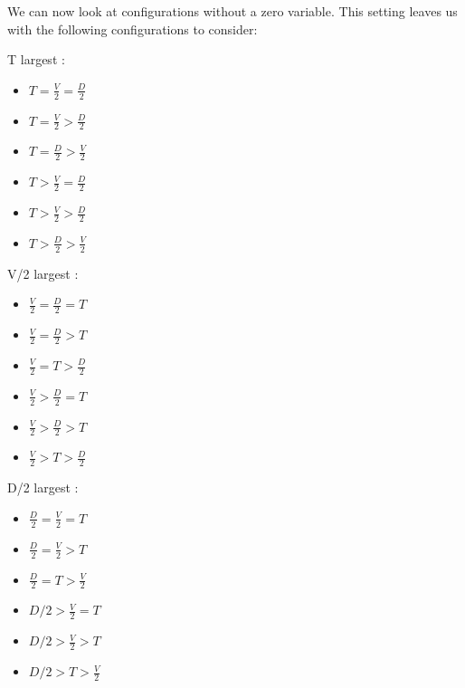 \documentclass[a4paper, 11pt]{article}
\begin{document}
We can now look at configurations without a zero variable. This setting leaves us with the following configurations to consider:

\begin{varwidth}[t]{.33\textwidth}
T largest :
\begin{itemize}
  \setlength\itemsep{0.5em}
  \item $T=\frac{V}{2}=\frac{D}{2}$
  \item $T=\frac{V}{2}>\frac{D}{2}$
  \item $T=\frac{D}{2}>\frac{V}{2}$
  \item $T>\frac{V}{2}=\frac{D}{2}$
  \item $T>\frac{V}{2}>\frac{D}{2}$
  \item $T>\frac{D}{2}>\frac{V}{2}$
\end{itemize}
\end{varwidth}%
\hspace{4em}%
\begin{varwidth}[t]{.33\textwidth}
V/2 largest :
\begin{itemize}
  \setlength\itemsep{0.5em}
  \item \textcolor{mygray}{$\frac{V}{2}=\frac{D}{2}=T$} %
  \item $\frac{V}{2}=\frac{D}{2}>T$
  \item \textcolor{mygray}{$\frac{V}{2}=T>\frac{D}{2}$} %
  \item $\frac{V}{2}>\frac{D}{2}=T$
  \item $\frac{V}{2}>\frac{D}{2}>T$
  \item $\frac{V}{2}>T>\frac{D}{2}$
\end{itemize}
\end{varwidth}
\hspace{4em}%
\begin{varwidth}[t]{.33\textwidth}
D/2 largest :
\begin{itemize}
  \setlength\itemsep{0.5em}
  \item \textcolor{mygray}{$\frac{D}{2}=\frac{V}{2}=T$} %
  \item \textcolor{mygray}{$\frac{D}{2}=\frac{V}{2}>T$}
  \item \textcolor{mygray}{$\frac{D}{2}=T > \frac{V}{2}$}
  \item $D/2>\frac{V}{2}=T$
  \item $D/2>\frac{V}{2}>T$
  \item $D/2>T>\frac{V}{2}$
\end{itemize}
\end{varwidth}
\end{document}
